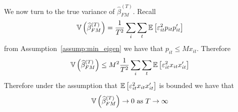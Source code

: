 \documentclass[12pt,twoside]{article}
\begin{document}
\begin{enumerate}[label = (\alph*)]
\begin{solution}
        We now turn to the true variance of \(\widehat\beta^{(T)}_{FM}\). Recall
        \[
            \mathbb{V}\left(\widehat\beta^{(T)}_{FM}\right) = \frac{1}{T^2}\sum_i\sum_t\mathbb{E}\left[\varepsilon_{it}^2p_{it}p_{it}^\prime\right]
        \]
        from Assumption~\ref{assump:min_eigen} we have that \(p_{it} \leq Mx_{it}\). Therefore
        \begin{align*}
            \mathbb{V}\left(\widehat\beta^{(T)}_{FM}\right)  \leq M^2\frac{1}{T^2}\sum_i\sum_t\mathbb{E}\left[\varepsilon_{it}^2x_{it}x_{it}^\prime\right]
        \end{align*}
        Therefore under the assumption that \(\mathbb{E}\left[\varepsilon_{it}^2 x_{it}x_{it}^\prime\right]\) is bounded we have that 
        \[
            \mathbb{V}\left(\widehat\beta^{(T)}_{FM}\right) \to 0 \text{ as } T \to \infty
        \]
    \end{solution}
\end{enumerate}
\end{document}
